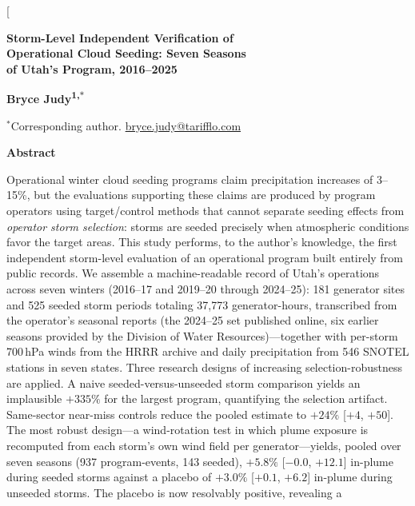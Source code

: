 \documentclass[9pt,twocolumn,twoside]{article}
\begin{document}
\twocolumn[{%
\thispagestyle{firstpage}
\vspace*{0.8cm}
{\noindent\sffamily\bfseries\LARGE Storm-Level Independent Verification of\\[2pt] Operational Cloud Seeding: Seven Seasons\\[2pt] of Utah's Program, 2016--2025\par}
\vspace{0.9em}
{\noindent\sffamily\bfseries\large Bryce Judy\textsuperscript{1,$*$}\par}
\vspace{0.6em}
{\noindent\footnotesize $^{*}$Corresponding author. \href{mailto:bryce.judy@tarifflo.com}{bryce.judy@tarifflo.com}\par}
\vspace{1.2em}
{\noindent\sffamily\bfseries\large Abstract\par}
\vspace{0.35em}
{\noindent\small
Operational winter cloud seeding programs claim precipitation increases of
3--15\%, but the evaluations supporting these claims are produced by program
operators using target/control methods that cannot separate seeding effects
from \emph{operator storm selection}: storms are seeded precisely when
atmospheric conditions favor the target areas. This study performs, to the
author's knowledge, the first independent storm-level evaluation of an
operational program built entirely from public records. We assemble a
machine-readable record of Utah's operations across seven winters
(2016--17 and 2019--20 through 2024--25): 181 generator sites and 525 seeded
storm periods totaling 37{,}773 generator-hours, transcribed from the
operator's seasonal reports (the 2024--25 set published online, six earlier
seasons provided by the Division of Water Resources)---together with per-storm 700\,hPa winds from the HRRR archive and
daily precipitation from 546 SNOTEL stations in seven states. Three research
designs of increasing selection-robustness are applied. A naive seeded-versus-unseeded
storm comparison yields an implausible $+335\%$ for the largest program,
quantifying the selection artifact. Same-sector near-miss controls reduce the
pooled estimate to $+24\%$ [$+4$, $+50$]. The most robust design---a
wind-rotation test in which plume exposure is recomputed from each storm's own
wind field per generator---yields, pooled over seven seasons (937
program-events, 143 seeded), $+5.8\%$ [$-0.0$, $+12.1$] in-plume during
seeded storms against a placebo of $+3.0\%$ [$+0.1$, $+6.2$] in-plume during
unseeded storms. The placebo is now resolvably positive, revealing a
}}
\end{document}
